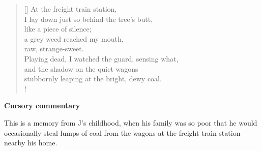 \documentclass[a4paper,12pt,twoside,final]{book}
\begin{document}
\begin{verse}[\versewidth]
  At the freight train station, \\
  I lay down just so behind the tree's butt, \\
  like a piece of silence; \\
  a grey weed reached my mouth, \\
  raw, strange-sweet. \\
  Playing dead, I watched the guard, sensing what, \\
  and the shadow on the quiet wagons \\
  stubbornly leaping at the bright, dewy coal. \\!
\end{verse}


\bigskip

\noindent \textbf{Cursory commentary}

\medskip

This is a memory from J's childhood, when his family was so poor that
he would occasionally steal lumps of coal from the wagons at the
freight train station nearby his home.

\newpage

\settowidth{\versewidth}{Csak ami nincs, annak van bokra,}
\end{document}
